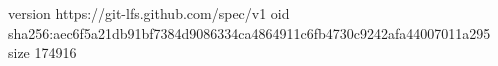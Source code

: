 version https://git-lfs.github.com/spec/v1
oid sha256:aec6f5a21db91bf7384d9086334ca4864911c6fb4730c9242afa44007011a295
size 174916
